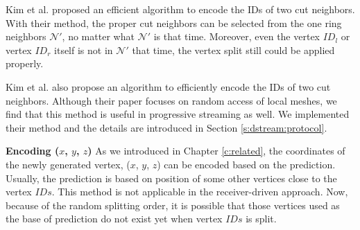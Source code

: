     Kim et al. \cite{multiresolution:kim} proposed an efficient algorithm to encode the IDs
    of two cut neighbors. With their method, the proper cut neighbors can be selected from
    the one ring neighbors $\mathcal{N}'$, no matter what $\mathcal{N}'$ is that time. 
    Moreover, even the vertex $ID_l$ or vertex $ID_r$ itself is not in $\mathcal{N'}$ that
    time, the vertex split still could be applied properly.

    Kim et al. \cite{multiresolution:kim} also propose an algorithm
    to efficiently encode the IDs of two cut neighbors.
    Although their paper focuses on random access of local meshes, we find that this 
	method is useful in progressive streaming as well. We implemented their method and
    the details are introduced in Section \ref{s:dstream:protocol}.
    
    \textbf{Encoding ($x$, $y$, $z$)}
    As we introduced in Chapter \ref{c:related}, the coordinates of the newly generated
    vertex, ($x$, $y$, $z$) can be encoded based on the prediction. Usually, the prediction
    is based on position of some other vertices close to the vertex $IDs$. This method is 
    not applicable in the receiver-driven approach. Now, because of the random splitting order, 
    it is possible that those vertices used as the base of prediction 
    do not exist yet when vertex $IDs$ is split. 
    
